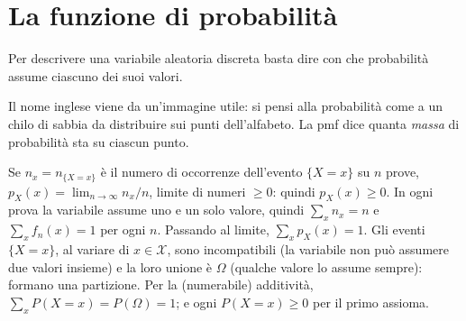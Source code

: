 \section{La funzione di probabilità}

Per descrivere una variabile aleatoria discreta basta dire con che probabilità assume ciascuno dei suoi valori.


Il nome inglese viene da un'immagine utile: si pensi alla probabilità come a un chilo di sabbia da distribuire sui
punti dell'alfabeto. La pmf dice quanta \emph{massa} di probabilità sta su ciascun punto.


\begin{dimostrazione}
 Se $n_x = n_{\{X = x\}}$ è il numero di occorrenze dell'evento $\{X = x\}$ su $n$ prove,
$p_X(x) = \lim_{n \to \infty} n_x / n$, limite di numeri $\geq 0$: quindi $p_X(x) \geq 0$.
 In ogni prova la variabile assume uno e un solo valore, quindi $\sum_{x} n_x = n$ e
$\sum_x f_n(x) = 1$ per ogni $n$. Passando al limite, $\sum_x p_X(x) = 1$.
 Gli eventi $\{X = x\}$, al variare di $x \in \mathcal{X}$, sono incompatibili (la variabile
non può assumere due valori insieme) e la loro unione è $\Omega$ (qualche valore lo assume sempre): formano una
partizione. Per la (numerabile) additività, $\sum_x P(X = x) = P(\Omega) = 1$; e ogni $P(X = x) \geq 0$ per il primo
assioma.
\end{dimostrazione}

